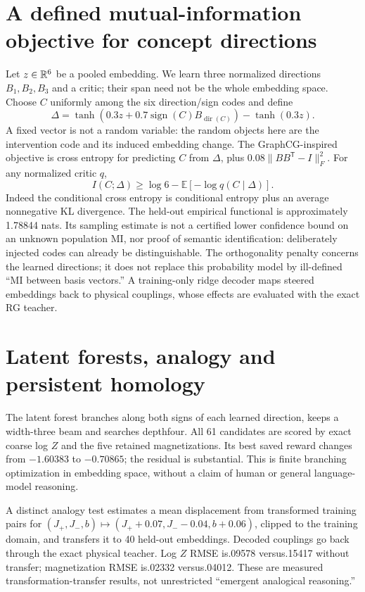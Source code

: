 \section{A defined mutual-information objective for concept directions}
Let $ z\in\mathbb R^6$ be a pooled embedding. We learn three normalized directions
$ B_1,B_2,B_3$ and a critic; their span need not be the whole embedding space.
Choose $ C $ uniformly among the six direction/sign codes and define
\[
 \Delta=\tanh(0.3 z+0.7\operatorname{sign}(C)B_{\operatorname{dir}(C)})
             -\tanh(0.3 z).
\]
A fixed vector is not a random variable: the random objects here are the
intervention code and its induced embedding change. The GraphCG-inspired
\cite{QGraphCG} objective is cross entropy for predicting $ C $ from $\Delta $,
plus $0.08\|BB^{\mathsf{T}}-I\|_F^2$. For any normalized critic $ q $,
\[
 I(C;\Delta)\ge\log 6-\mathbb E[-\log q(C\mid\Delta)].
\]
Indeed the conditional cross entropy is conditional entropy plus an
average nonnegative KL divergence. The held-out empirical functional is
approximately 1.78844 nats. Its sampling estimate is not a certified lower
confidence bound on an unknown population MI, nor proof of semantic
identification: deliberately injected codes can already be distinguishable.
The orthogonality penalty concerns the learned directions; it does not
replace this probability model by ill-defined ``MI between basis vectors.''
A training-only ridge decoder maps steered embeddings back to physical
couplings, whose effects are evaluated with the exact RG teacher.

\section{Latent forests, analogy and persistent homology}
The latent forest branches along both signs of each learned direction,
keeps a width-three beam and searches depthfour. All 61 candidates are scored
by exact coarse log $ Z $ and the five retained magnetizations. Its best saved
reward changes from $-1.60383$ to $-0.70865$; the residual is substantial.
This is finite branching optimization in embedding space, without a claim
of human or general language-model reasoning.

A distinct analogy test estimates a mean displacement from transformed
training pairs for $(J_+,J_-,b)\mapsto(J_++0.07,J_--0.04,b+0.06)$, clipped
to the training domain, and transfers it to 40 held-out embeddings. Decoded
couplings go back through the exact physical teacher. Log $ Z $ RMSE is.09578
versus.15417 without transfer; magnetization RMSE is.02332 versus.04012.
These are measured transformation-transfer results, not unrestricted
``emergent analogical reasoning.''

